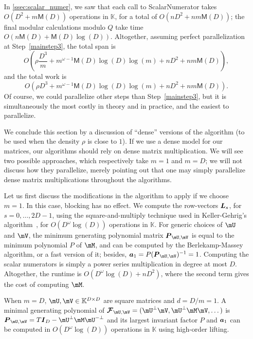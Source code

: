 \documentclass[12pt]{article}
\newcommand{\mat}[1]{\bm{\MakeUppercase{#1}}} %
\newcommand{\row}[1]{\bm{\MakeLowercase{#1}}} %
\newcommand{\seq}{\mat{\mathcal{F}}} %
\newcommand{\minpoly}{P}
\newcommand{\sqfree}{Q}
\newcommand{\density}{\rho}
\def\M {\ensuremath{\mathsf{M}}}
\def\K{\mathbb{K}}
\def\K {\ensuremath{\mathbb{K}}}
\begin{document}
In \cref{ssec:scalar_numer}, we saw that each call to {\sf ScalarNumerator}
takes $O(D^2 + m\M(D))$ operations in $\K$, for a total of $O(nD^2 + n
m\M(D))$; the final modular calculations modulo $\sqfree$ take time $O(n\M(D) + \M(D) \log(D))$.
Altogether, assuming perfect parallelization 
at Step~\ref{mainstep3}, the total span is
$$O\left (\density \frac{D^3}m + m^{\omega-1} \M(D) \log(D) \log(m) + nD^2 + nm\M(D)\right ),$$
and the total work is
$$O\left (\density D^3 + m^{\omega-1} \M(D) \log(D) \log(m) + nD^2 +
nm\M(D)\right ).$$ Of course, we could parallelize other steps than
Step~\ref{mainstep3}, but it is simultaneously the most costly in
theory and in practice, and the easiest to parallelize. 

\medskip

We conclude this section by a discussion of ``dense'' versions of the
algorithm (to be used when the density $\density$ is close to $1$). 
If we use a dense model for our matrices, our algorithms
should rely on dense matrix multiplication. We will see two possible
approaches, which respectively take $m=1$ and $m=D$; we will not
discuss how they parallelize, merely pointing out that one may simply
parallelize dense matrix multiplications throughout the algorithms.

Let us first discuss the modifications in the algorithm to apply if we choose
$m=1$. In this case, blocking has no effect. We compute the
row-vectors $\mat{L}_s$, for $s=0,\dots,2D-1$, using the
square-and-multiply technique used in Keller-Gehrig's
algorithm~\cite{Keller85}, for $O(D^\omega \log(D))$ operations in
$\K$. For generic choices of $\mU$ and $\mV$, the minimum generating
polynomial matrix $\mat{P}_{\mU,\mV}$ is equal to the minimum
polynomial $\minpoly$ of $\mM$, and can be computed by the
Berlekamp-Massey algorithm, or a fast version of it; besides,
$\row{a}_1 = P (\mat{P}_{\mU,\mV})^{-1} = 1$. Computing the scalar
numerators is simply a power series multiplication in degree at most
$D$. Altogether, the runtime is $O(D^{\omega} \log(D) + nD^2)$, where
the second term gives the cost of computing $\mM$.


When $m = D$, $\mU,\mV \in \mathbb{K}^{D \times D}$ are square
matrices and $d = D/m = 1$. A minimal generating polynomial of
$\seq_{\mU,\mV} = (\mU^\perp\mV, \mU^\perp\mM\mV,\dots)$ is
$\mat{P}_{\mU,\mV} = T \mat{I}_D - \mU^\perp\mM\mU^{-\perp}$ and its
largest invariant factor $\minpoly$ and $\row{a}_1$ can be computed in
$O(D^\omega \log(D))$ operations in $\K$ using high-order lifting.
\end{document}
